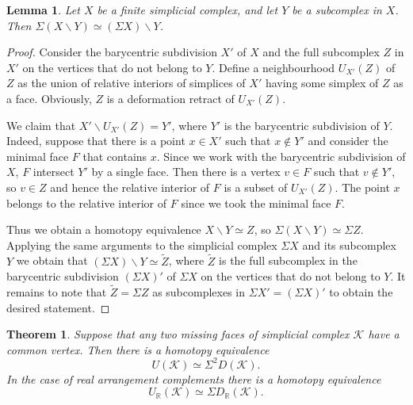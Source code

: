 \documentclass[a4paper,12pt]{amsart}
\newcommand{\K}{\mathcal K}
\newcommand{\RR}{\mathbb R}
\newtheorem{lemma}[formula]{Lemma}
\newtheorem{theorem}[formula]{Theorem}
\theoremstyle{definition}
\theoremstyle{remark}
\numberwithin{equation}{section}
\begin{document}
\begin{lemma}\label{sus}
	Let $X$ be a finite simplicial complex, and let $Y$ be a subcomplex in $X$. Then $\Sigma(X \backslash Y) \simeq (\Sigma X) \backslash Y$.
\end{lemma}
\begin{proof}
Consider the barycentric subdivision $X'$ of $X$ and the full subcomplex $Z$ in $X'$ on the vertices that do not belong to $Y$.
Define a neighbourhood $U_{X'}(Z)$ of $Z$ as the union of relative interiors of simplices of $X'$ having some simplex of $Z$ as a face.
Obviously, $Z$ is a deformation retract of $U_{X'}(Z)$. 

We claim that $X' \backslash U_{X'}(Z) = Y'$, where $Y'$ is the barycentric subdivision of $Y$.
Indeed, suppose that there is a point $x \in X'$ such that $x \notin Y'$ and consider the minimal face $F$ that contains $x$. 
Since we work with the barycentric subdivision of $X$, $F$ intersect $Y'$ by a single face.
Then there is a vertex $v \in F$ such that $v \notin Y'$, so $v \in Z$ and hence the relative interior of $F$ is a subset of $U_{X'}(Z)$.
The point $x$ belongs to the relative interior of $F$ since we took the minimal face $F$.

Thus we obtain a homotopy equivalence $X \backslash Y \simeq Z$, so $\Sigma(X \backslash Y) \simeq \Sigma Z$.
Applying the same arguments to the simplicial complex $\Sigma X$ and its subcomplex $Y$ we obtain that $(\Sigma X) \backslash Y \simeq \widetilde{Z}$,
where $\widetilde{Z}$ is the full subcomplex in the barycentric subdivision $(\Sigma X)'$ of $\Sigma X$ on the vertices that do not belong to $Y$. It remains to note that
$\widetilde{Z} = \Sigma Z$ as subcomplexes in $\Sigma X' = (\Sigma X)'$ to obtain the desired statement.
\end{proof}
\begin{theorem}\label{res2}
	Suppose that any two missing faces of simplicial complex $\K$ have a common vertex. Then there is a homotopy equivalence
	$$U(\K) \simeq \Sigma^2 D(\K).$$
	In  the case of real arrangement complements there is a homotopy equivalence 
 $$U_{\RR}(\K) \simeq \Sigma D_{\RR}(\K).$$
\end{theorem}
\end{document}
